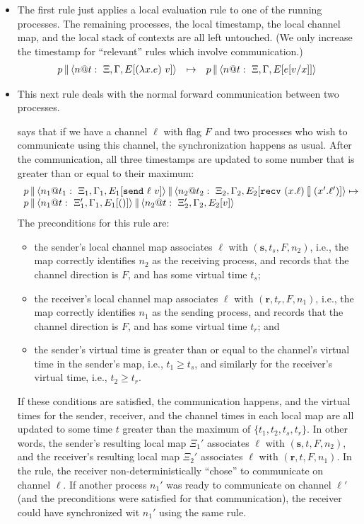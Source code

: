 \documentclass{article}
\begin{document}
\begin{itemize}
\item The first rule just applies a local evaluation rule to one of the
  running processes. The remaining processes, the local timestamp, the local
  channel map, and the local stack of contexts are all left untouched. (We
  only increase the timestamp for ``relevant'' rules which involve
  communication.)
\[\begin{array}{rcl}
  \parc{p}{\proc{n}{\Gamma}{\Xi}{E[(\lambda x.e)~v]}{t}} &\mapsto& 
  \parc{p}{\proc{n}{\Gamma}{\Xi}{E[e[v/x]]}{t}}
\end{array}\]

\item This next rule deals with the normal forward communication between two
  processes. 

says that if we have a channel $\ell$ with flag $F$ and two
  processes who wish to communicate using this channel, the synchronization
  happens as usual. After the communication, all three timestamps are updated
  to some number that is greater than or equal to their maximum:
\[\begin{array}{l}
  \parc{p}
  {\parc{\proc{n_1}{\Gamma_1}{\Xi_1}{E_1[\send{\ell}{v}]}{t_1}}
        {\proc{n_2}{\Gamma_2}{\Xi_2}{E_2[\recv{x}{\ell}{x'}{\ell'}]}{t_2}}}
  \mapsto \\
  \parc{p}{\parc{\proc{n_1}{\Gamma_1}{\Xi_1'}{E_1[()]}{t}}
    {\proc{n_2}{\Gamma_2}{\Xi_2'}{E_2[v]}{t}}}
\end{array}\]
The preconditions for this rule are: 
\begin{itemize}
\item the sender's local channel map associates $\ell$ with
  $(\textbf{s},t_s,F,n_2)$, i.e., the map correctly identifies $n_2$ as the
  receiving process, and records that the channel direction is $F$, and has
  some virtual time $t_s$;
\item the receiver's local channel map associates $\ell$ with
  $(\textbf{r},t_r,F,n_1)$, i.e., the map correctly identifies $n_1$ as the
  sending process, and records that the channel direction is $F$, and has
  some virtual time $t_r$; and
\item the sender's virtual time is greater than or equal to the channel's
  virtual time in the sender's map, i.e., $t_1 \geq t_s$, and similarly for
  the receiver's virtual time, i.e., $t_2 \geq t_r$.
\end{itemize}
If these conditions are satisfied, the communication happens, and the virtual
times for the sender, receiver, and the channel times in each local map are
all updated to some time $t$ greater than the maximum of
$\{t_1,t_2,t_s,t_r\}$. In other words, the sender's resulting local map
$\Xi_1'$ associates $\ell$ with $(\textbf{s},t,F,n_2)$, and the receiver's
resulting local map $\Xi_2'$ associates $\ell$ with
$(\textbf{r},t,F,n_1)$. In the rule, the receiver non-deterministically
``chose'' to communicate on channel $\ell$. If another process $n_1'$ was
ready to communicate on channel $\ell'$ (and the preconditions were satisfied
for that communication), the receiver could have synchronized wit $n_1'$
using the same rule.


\end{itemize}
\end{document}
